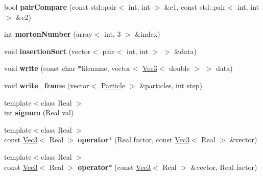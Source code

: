 \begin{DoxyCompactItemize}
\item 
\hypertarget{namespacehokusai_aca1c8c59adb97f9ad5c79541bd865727}{bool {\bfseries pair\+Compare} (const std\+::pair$<$ int, int $>$ \&e1, const std\+::pair$<$ int, int $>$ \&e2)}\label{namespacehokusai_aca1c8c59adb97f9ad5c79541bd865727}

\item 
\hypertarget{namespacehokusai_afcbb7f78c66042d39966258c28646fcb}{int {\bfseries morton\+Number} (array$<$ int, 3 $>$ \&index)}\label{namespacehokusai_afcbb7f78c66042d39966258c28646fcb}

\item 
\hypertarget{namespacehokusai_ad0d77b77acc4de858b56b25ec798cde0}{void {\bfseries insertion\+Sort} (vector$<$ pair$<$ int, int $>$ $>$ \&data)}\label{namespacehokusai_ad0d77b77acc4de858b56b25ec798cde0}

\item 
\hypertarget{namespacehokusai_ad37fe0e67b73e0f68f89253d1c09cca0}{void {\bfseries write} (const char $\ast$filename, vector$<$ \hyperlink{classhokusai_1_1Vec3}{Vec3}$<$ double $>$ $>$ data)}\label{namespacehokusai_ad37fe0e67b73e0f68f89253d1c09cca0}

\item 
\hypertarget{namespacehokusai_a9d9a6b13af1050af02b020076aefc86b}{void {\bfseries write\+\_\+frame} (vector$<$ \hyperlink{classhokusai_1_1Particle}{Particle} $>$ \&particles, int step)}\label{namespacehokusai_a9d9a6b13af1050af02b020076aefc86b}

\item 
\hypertarget{namespacehokusai_acd4ba82e9cc2c2d841dd67aadcc078f3}{{\footnotesize template$<$class Real $>$ }\\int {\bfseries signum} (Real val)}\label{namespacehokusai_acd4ba82e9cc2c2d841dd67aadcc078f3}

\item 
\hypertarget{namespacehokusai_a71a88019f665ef5df3dc6562d4bbe095}{{\footnotesize template$<$class Real $>$ }\\const \hyperlink{classhokusai_1_1Vec3}{Vec3}$<$ Real $>$ {\bfseries operator$\ast$} (Real factor, const \hyperlink{classhokusai_1_1Vec3}{Vec3}$<$ Real $>$ \&vector)}\label{namespacehokusai_a71a88019f665ef5df3dc6562d4bbe095}

\item 
\hypertarget{namespacehokusai_a275b7859456db160f7afa3f5eb8d835a}{{\footnotesize template$<$class Real $>$ }\\const \hyperlink{classhokusai_1_1Vec3}{Vec3}$<$ Real $>$ {\bfseries operator$\ast$} (const \hyperlink{classhokusai_1_1Vec3}{Vec3}$<$ Real $>$ \&vector, Real factor)}\label{namespacehokusai_a275b7859456db160f7afa3f5eb8d835a}


\end{DoxyCompactItemize}
